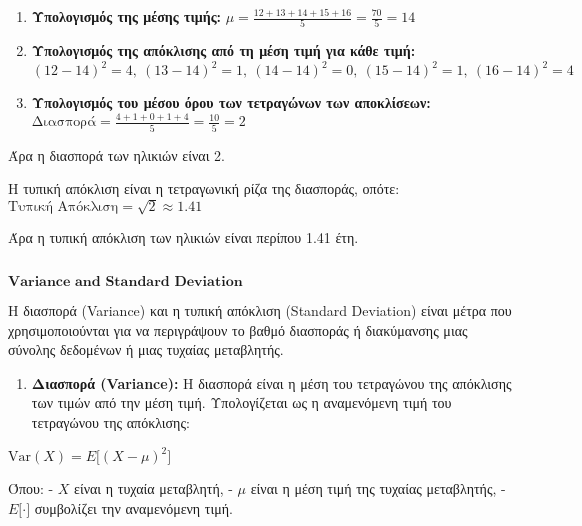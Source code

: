 \documentclass[11pt]{article}
\makeatletter
\providecommand{\tightlist}{%
      \setlength{\itemsep}{0pt}\setlength{\parskip}{0pt}}
\newcommand{\boxspacing}{\kern\kvtcb@left@rule\kern\kvtcb@boxsep}
\newcommand{\prompt}[4]{
        {\ttfamily\llap{{\color{#2}[#3]:\hspace{3pt}#4}}\vspace{-\baselineskip}}
    }
\makeatother
\begin{document}
\begin{enumerate}
\def\labelenumi{\arabic{enumi}.}
\item
  \textbf{Υπολογισμός της μέσης τιμής:} $ \mu =
  \frac{12 + 13 + 14 + 15 + 16}{5} = \frac{70}{5} = 14 $
\item
  \textbf{Υπολογισμός της απόκλισης από τη μέση τιμή για κάθε τιμή:} $
  (12 - 14)^2 = 4, ~(13 - 14)^2 = 1, ~(14 - 14)^2 = 0, ~(15 -
  14)^2 = 1, ~(16 - 14)^2 = 4 $
\item
  \textbf{Υπολογισμός του μέσου όρου των τετραγώνων των αποκλίσεων:} $
  \text{Διασπορά} = \frac{4 + 1 + 0 + 1 + 4}{5} = \frac{10}{5} = 2 $
\end{enumerate}

Άρα η διασπορά των ηλικιών είναι 2.

Η τυπική απόκλιση είναι η τετραγωνική ρίζα της διασποράς, οπότε: $
\text{Τυπική Απόκλιση} = \sqrt{2} \approx 1.41 $

Άρα η τυπική απόκλιση των ηλικιών είναι περίπου 1.41 έτη.

    \begin{tcolorbox}[breakable, size=fbox, boxrule=1pt, pad at break*=1mm,colback=cellbackground, colframe=cellborder]
\prompt{In}{incolor}{ }{\boxspacing}
\begin{Verbatim}[commandchars=\\\{\}]

\end{Verbatim}
\end{tcolorbox}

    \(\textbf{Variance and Standard Deviation}\)

    Η διασπορά (Variance) και η τυπική απόκλιση (Standard Deviation) είναι
μέτρα που χρησιμοποιούνται για να περιγράψουν το βαθμό διασποράς ή
διακύμανσης μιας σύνολης δεδομένων ή μιας τυχαίας μεταβλητής.

\begin{enumerate}
\def\labelenumi{\arabic{enumi}.}
\tightlist
\item
  \textbf{Διασπορά (Variance):} Η διασπορά είναι η μέση του τετραγώνου
  της απόκλισης των τιμών από την μέση τιμή. Υπολογίζεται ως η
  αναμενόμενη τιμή του τετραγώνου της απόκλισης:
\end{enumerate}

$ \text{Var}(X) = E{[}(X - \mu)^2{]} $

Όπου: - $ X $ είναι η τυχαία μεταβλητή, - $ \mu $ είναι η μέση τιμή
της τυχαίας μεταβλητής, - $ E{[}\cdot{]} $ συμβολίζει την αναμενόμενη
τιμή.
\end{document}
